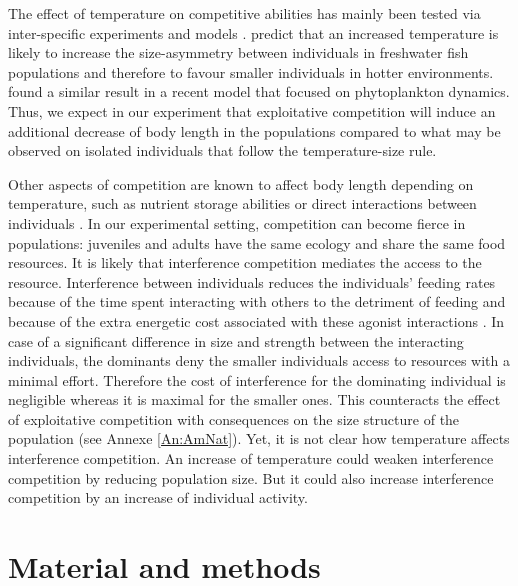 The effect of temperature on competitive abilities has mainly been tested via
inter-specific experiments \autocites{park1954a,tilman1981competition} and
models \autocites{vasseur2005a,gilman2010framework}.
\textcites{ohlberger2012a} predict that an increased temperature is likely to
increase the size-asymmetry between individuals in freshwater fish populations
and therefore to favour smaller individuals in hotter environments.
\textcites{reuman2014metabolic} found a similar result in a recent model that
focused on phytoplankton dynamics. Thus, we expect in our experiment that
exploitative competition will induce an additional decrease of body length in
the populations compared to what may be observed on isolated individuals that
follow the temperature-size rule.

Other aspects of competition are known to affect body length depending on
temperature, such as nutrient storage abilities
\autocites{litchman2009contrasting} or direct interactions between individuals
\autocites{park1962a,schoener1983a,anholt1990a,smallegange2006a,nakayama2010a,mccormick2012a}.
In our experimental setting, competition can become fierce in populations:
juveniles and adults have the same ecology and share the same food resources.
It is likely that interference competition mediates the access to the
resource. Interference between individuals reduces the individuals’ feeding
rates because of the time spent interacting with others to the detriment of
feeding \autocites{smallegange2006a} and because of the extra energetic
cost associated with these agonist interactions \autocites{briffa2007a}.
In case of a significant difference in size and strength between the interacting individuals, the
dominants deny the smaller individuals access to resources with a minimal
effort. Therefore the cost of interference for the dominating individual is
negligible whereas it is maximal for the smaller ones.
This counteracts the effect of exploitative competition with consequences on the
size structure of the population (see Annexe \ref{An:AmNat}). Yet, it is not
clear how temperature affects interference competition. An increase of
temperature could weaken interference competition by reducing population size.
But it could also increase interference competition by an increase of individual
activity.


\section{Material and methods}


